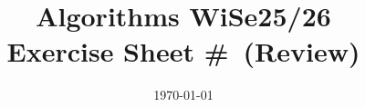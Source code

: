 \documentclass[11pt,a4paper]{article}
\title{
    \vspace{-2cm}
    \Large\textbf{Algorithms WiSe25/26}\\
    \large Exercise Sheet \#\exercisenum\ifreviewmode\ (Review)\fi
    \vspace{-0.5cm}
}
\author{}  %
\date{\today}
\newcommand{\exercisenum}{X}
\newif\ifreviewmode
\begin{document}

\newcommand{\exercisetitle}[1]{%
    \newpage%
    \setcounter{page}{1}%
    \nolinenumbers%
    \thispagestyle{fancy}%
    {\centering\Large\textbf{Algorithms WiSe25/26}\par}%
    {\centering\large Exercise Sheet \#\exercisenum\ifreviewmode\ (Review)\fi\par}%
    {\centering\normalsize\today\par}%
    \noindent\rule{\textwidth}{0.4pt}%
    \vspace{1em}%
    \section*{#1}%
    \resetlinenumber%
    \linenumbers%
}

\newcommand{\exercisepart}[1]{%
    \nolinenumbers%
    \subsection*{#1}%
    \linenumbers%
}


\end{document}
